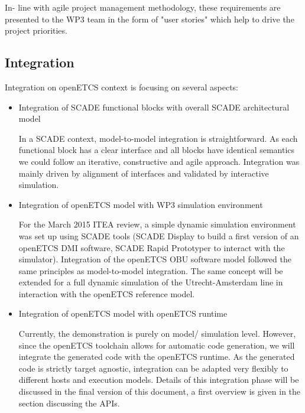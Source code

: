 In- line with agile project management methodology, these requirements are presented to the WP3 team in the form of "user stories" which help to drive the project priorities.

\subsection{Integration}

Integration on openETCS context is focusing on several aspects:
\begin{itemize}

\item Integration of SCADE functional blocks with overall SCADE architectural model

In a SCADE context, model-to-model integration is straightforward. As each functional block has a clear interface and all blocks have identical semantics we could follow an iterative, constructive and agile approach.
Integration was mainly driven by alignment of interfaces and validated by interactive simulation. 


\item Integration of openETCS model with WP3 simulation environment 

For the March 2015 ITEA review, a simple dynamic simulation environment was set up using SCADE tools (SCADE Display to build a first version of an openETCS DMI software, SCADE Rapid Prototyper to interact with the simulator).
Integration of the openETCS OBU software model followed the same principles as model-to-model integration.
The same concept will be extended for a full dynamic simulation of the Utrecht-Amsterdam line in interaction with the openETCS reference model.


\item Integration of openETCS model with openETCS runtime

Currently, the demonstration is purely on model/ simulation level. However, since the openETCS toolchain allows for automatic code generation, we will integrate the generated code with the openETCS runtime. 
As the generated code is strictly target agnostic, integration can be adapted very flexibly to different hosts and execution models.
Details of this integration phase will be discussed in the final version of this document, a first overview is given in the section discussing the APIs.
%
%
%
%
\end{itemize}

